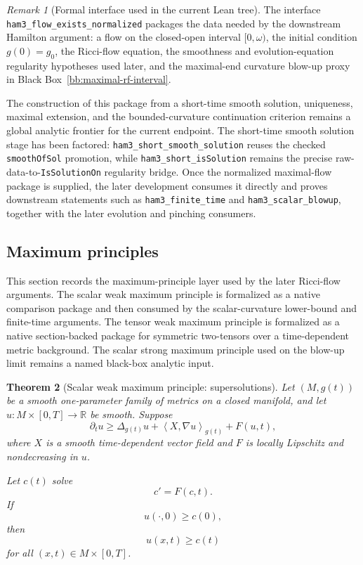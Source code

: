 \documentclass[11pt]{article}
\theoremstyle{plain}
\newtheorem{theorem}{Theorem}[section]
\theoremstyle{definition}
\theoremstyle{remark}
\newtheorem{remark}[theorem]{Remark}
\newcommand{\ip}[2]{\left\langle #1,#2\right\rangle}
\newcommand{\leanref}[1]{\nolinkurl{#1}}
\begin{document}
\begin{remark}[Formal interface used in the current Lean tree]
The interface \leanref{ham3_flow_exists_normalized} packages the data needed by
the downstream Hamilton argument: a flow on the closed-open interval
\([0,\omega)\), the initial condition \(g(0)=g_0\), the Ricci-flow equation,
the smoothness and evolution-equation regularity hypotheses used later, and the
maximal-end curvature blow-up proxy in Black
Box~\ref{bb:maximal-rf-interval}.

The construction of this package from a short-time smooth solution, uniqueness,
maximal extension, and the bounded-curvature continuation criterion remains a
global analytic frontier for the current endpoint.  The short-time smooth
solution stage has been factored: \leanref{ham3_short_smooth_solution} reuses
the checked \leanref{smoothOfSol} promotion, while
\leanref{ham3_short_isSolution} remains the precise raw-data-to-\leanref{IsSolutionOn}
regularity bridge.  Once the normalized maximal-flow package is supplied, the
later development consumes it directly and proves downstream statements such as
\leanref{ham3_finite_time} and \leanref{ham3_scalar_blowup}, together with the
later evolution and pinching
consumers.
\end{remark}

\subsection{Maximum principles}

This section records the maximum-principle layer used by the later Ricci-flow
arguments.  The scalar weak maximum principle is formalized as a native
comparison package and then consumed by the scalar-curvature lower-bound and
finite-time arguments.  The tensor weak maximum principle is formalized as a
native section-backed package for symmetric two-tensors over a time-dependent
metric background.  The scalar strong maximum principle used on the blow-up
limit remains a named black-box analytic input.

\begin{theorem}[Scalar weak maximum principle: supersolutions]
\label{thm:scalar-wmp-super}
Let $(M,g(t))$ be a smooth one-parameter family of metrics on a closed
manifold, and let $u:M\times[0,T]\to\mathbb R$ be smooth. Suppose
\[
\partial_tu
\ge
\Delta_{g(t)}u+
\ip{X}{\nabla u}_{g(t)}+F(u,t),
\]
where $X$ is a smooth time-dependent vector field and $F$ is locally Lipschitz
and nondecreasing in $u$.

Let $c(t)$ solve
\[
c'=F(c,t).
\]
If
\[
u(\cdot,0)\ge c(0),
\]
then
\[
u(x,t)\ge c(t)
\]
for all $(x,t)\in M\times[0,T]$.
\end{theorem}
\end{document}
